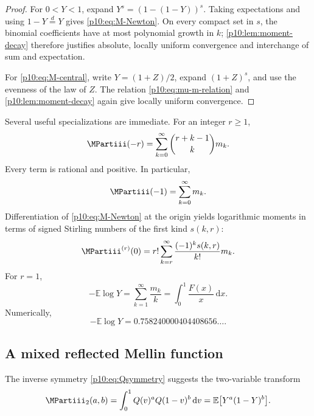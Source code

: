 \documentclass[11pt,oneside]{article}
\theoremstyle{definition}
\theoremstyle{remark}
\newcommand{\F}{F}
\newcommand{\Q}{Q}
\newcommand{\E}{\mathbb E}
\newcommand{\dd}{\,\mathrm d}
\newcommand{\1}{\mathbf 1}
\begin{document}
\begin{proof}
For \(0<Y<1\), expand
\(Y^s=(1-(1-Y))^s\).  Taking expectations and using
\(1-Y\overset d=Y\) gives \cref{p10:eq:M-Newton}.  On every compact set in \(s\), the
binomial coefficients have at most polynomial growth in \(k\); \cref{p10:lem:moment-decay}
therefore justifies absolute, locally uniform convergence and interchange of sum and
expectation.

For \cref{p10:eq:M-central}, write \(Y=(1+Z)/2\), expand \((1+Z)^s\), and use the
evenness of the law of \(Z\).  The relation \cref{p10:eq:mu-m-relation} and
\cref{p10:lem:moment-decay} again give locally uniform convergence.
\end{proof}

Several useful specializations are immediate.  For an integer \(r\ge1\),
\begin{equation}\label{p10:eq:negative-moment-rational-series}
 \MPartiii(-r)=\sum_{k=0}^{\infty}\binom{r+k-1}{k}m_k.
\end{equation}
Every term is rational and positive.  In particular,
\begin{equation}\label{p10:eq:Mminus1-series}
 \MPartiii(-1)=\sum_{k=0}^{\infty}m_k.
\end{equation}
Differentiation of \cref{p10:eq:M-Newton} at the origin yields logarithmic moments in
terms of signed Stirling numbers of the first kind \(s(k,r)\):
\begin{equation}\label{p10:eq:log-moment-Stirling}
 \MPartiii^{(r)}(0)
 =r!\sum_{k=r}^{\infty}\frac{(-1)^ks(k,r)}{k!}m_k.
\end{equation}
For \(r=1\),
\begin{equation}\label{p10:eq:log-moment-constant}
 -\E\log Y
 =\sum_{k=1}^{\infty}\frac{m_k}{k}
 =\int_0^1\frac{\F(x)}x\dd x.
\end{equation}
Numerically,
\begin{equation}\label{p10:eq:log-moment-numeric}
 -\E\log Y=0.758240000404408656\ldots.
\end{equation}

\subsection{A mixed reflected Mellin function}

The inverse symmetry \cref{p10:eq:Qsymmetry} suggests the two-variable transform
\begin{equation}\label{p10:eq:M2def}
 \MPartiii_2(a,b)=\int_0^1\Q(v)^a\Q(1-v)^b\dd v
 =\E\bigl[Y^a(1-Y)^b\bigr].
\end{equation}
\end{document}
